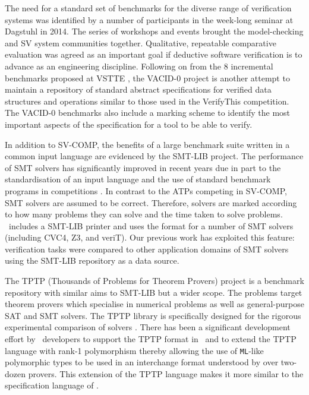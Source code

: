 The need for a standard set of benchmarks for the diverse range of verification systems was identified by a number of participants in the week-long seminar at Dagstuhl \cite{Dagstuhl} in 2014. The series of workshops and events brought the model-checking and SV system communities together. Qualitative, repeatable comparative evaluation was agreed as an important goal if deductive software verification is to advance as an engineering discipline. Following on from the 8 incremental benchmarks proposed at VSTTE \cite{Weide2008}, the VACID-0 \cite{Leino10vacid-0:verification} project is another attempt to maintain a repository of standard abstract specifications for verified data structures and operations similar to those used in the VerifyThis competition. The VACID-0 benchmarks also include a marking scheme to identify the most important aspects of the specification for a tool to be able to verify.

In addition to SV-COMP, the benefits of a large benchmark suite written in a common input language are evidenced by the SMT-LIB \cite{SMTLIB} project. 
The performance of SMT solvers has significantly improved in recent years due in part to the standardisation of an input language and the use of standard benchmark programs in competitions \cite{SMTEVAL2013}. 
In contrast to the ATPs competing in SV-COMP, SMT solvers are assumed to be correct. Therefore, solvers are marked according to how many problems they can solve and the time taken to solve problems.
\why~includes a SMT-LIB printer and uses the format for a number of SMT solvers (including CVC4, Z3, and veriT). Our previous work \cite{Healy:2016} has exploited this feature: verification tasks were compared to other application domains of SMT solvers using the SMT-LIB repository as a data source.

The TPTP (Thousands of Problems for Theorem Provers) project \cite{TPTP} is a benchmark repository with similar aims to SMT-LIB but a wider scope. The problems target theorem provers which specialise in numerical problems as well as general-purpose SAT and SMT solvers. The TPTP library is specifically designed for the rigorous experimental comparison of solvers \cite{Sutcliffe200139}. There has been a significant development effort by \why~developers to support the TPTP format in \why~and to extend the TPTP language with rank-1 polymorphism \cite{why:tptp} thereby allowing the use of \texttt{ML}-like polymorphic types to be used in an interchange format understood by over two-dozen provers. This extension of the TPTP language makes it more similar to the specification language of \why.   \\

